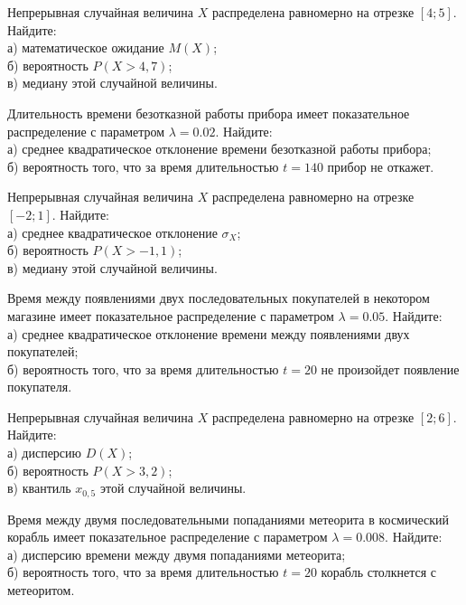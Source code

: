 \vfill

\newpage\setcounter{zad}{0}

\z Непрерывная случайная величина $X$ распределена равномерно на отрезке $[4; 5]$. Найдите: \\ \quad а) математическое ожидание $M(X)$; \\ \quad б) вероятность $P(X>4{,}7)$; \\ \quad в) медиану этой случайной величины.


\vfill

\z Длительность времени безотказной работы прибора имеет показательное распределение с параметром $\lambda = 0.02$. Найдите: \\ \quad а) среднее квадратическое отклонение времени безотказной работы прибора; \\ \quad б) вероятность того, что за время длительностью $t = 140$ прибор не откажет.
 

\vfill

\newpage\setcounter{zad}{0}

\z Непрерывная случайная величина $X$ распределена равномерно на отрезке $[-2; 1]$. Найдите: \\ \quad а) среднее квадратическое отклонение $\sigma_X$; \\ \quad б) вероятность $P(X>-1{,}1)$; \\ \quad в) медиану этой случайной величины.


\vfill

\z Время между появлениями двух последовательных покупателей в некотором магазине имеет показательное распределение с параметром $\lambda = 0.05$. Найдите: \\ \quad а) среднее квадратическое отклонение времени между появлениями двух покупателей; \\ \quad б) вероятность того, что за время длительностью $t = 20$ не произойдет появление покупателя.
 

\vfill

\newpage\setcounter{zad}{0}

\z Непрерывная случайная величина $X$ распределена равномерно на отрезке $[2; 6]$. Найдите: \\ \quad а) дисперсию $D(X)$; \\ \quad б) вероятность $P(X>3{,}2)$; \\ \quad в) квантиль $x_{0{,}5}$ этой случайной величины.


\vfill

\z Время между двумя последовательными попаданиями метеорита в космический корабль имеет показательное распределение с параметром $\lambda = 0.008$. Найдите: \\ \quad а) дисперсию времени между двумя попаданиями метеорита; \\ \quad б) вероятность того, что за время длительностью $t = 20$ корабль  столкнется с метеоритом.
 

\vfill

\newpage\setcounter{zad}{0}